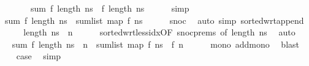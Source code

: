 \begin{isabellebody}
\ \ \ \ \ \ {\isacharequal}{\kern0pt}\ sum\ f\ {\isacharbraceleft}{\kern0pt}{}{\isachardot}{\kern0pt}{\isachardot}{\kern0pt}{\isacharless}{\kern0pt}length\ ns{\isacharbraceright}{\kern0pt}\ {\isacharplus}{\kern0pt}\ f\ {\isacharparenleft}{\kern0pt}length\ ns{\isacharparenright}{\kern0pt}{\isachardoublequoteclose}\isanewline
\ \ \ \ \isamarkupfalse%
\ simp\isanewline
\ \ \isamarkupfalse%
\ \isamarkupfalse%
\ {\isachardoublequoteopen}sum\ f\ {\isacharbraceleft}{\kern0pt}{}{\isachardot}{\kern0pt}{\isachardot}{\kern0pt}{\isacharless}{\kern0pt}length\ ns{\isacharbraceright}{\kern0pt}\ {\isasymle}\ sum{\isacharunderscore}{\kern0pt}list\ {\isacharparenleft}{\kern0pt}map\ f\ ns{\isacharparenright}{\kern0pt}{\isachardoublequoteclose}\isanewline
\ \ \ \ \isamarkupfalse%
\ snoc\ \isamarkupfalse%
\ {\isacharparenleft}{\kern0pt}auto\ simp{\isacharcolon}{\kern0pt}\ sorted{\isacharunderscore}{\kern0pt}wrt{\isacharunderscore}{\kern0pt}append{\isacharparenright}{\kern0pt}\isanewline
\ \ \isamarkupfalse%
\ \isamarkupfalse%
\ {\isachardoublequoteopen}length\ ns\ {\isasymle}\ n{\isachardoublequoteclose}\isanewline
\ \ \ \ \isamarkupfalse%
\ sorted{\isacharunderscore}{\kern0pt}wrt{\isacharunderscore}{\kern0pt}less{\isacharunderscore}{\kern0pt}idx{\isacharbrackleft}{\kern0pt}OF\ snoc{\isachardot}{\kern0pt}prems{\isacharparenleft}{\kern0pt}{}{\isacharparenright}{\kern0pt}{\isacharcomma}{\kern0pt}\ of\ {\isachardoublequoteopen}length\ ns{\isachardoublequoteclose}{\isacharbrackright}{\kern0pt}\ \isamarkupfalse%
\ auto\isanewline
\ \ \isamarkupfalse%
\ \isamarkupfalse%
\ {\isachardoublequoteopen}sum\ f\ {\isacharbraceleft}{\kern0pt}{}{\isachardot}{\kern0pt}{\isachardot}{\kern0pt}{\isacharless}{\kern0pt}length\ {\isacharparenleft}{\kern0pt}ns\ {\isacharat}{\kern0pt}\ {\isacharbrackleft}{\kern0pt}n{\isacharbrackright}{\kern0pt}{\isacharparenright}{\kern0pt}{\isacharbraceright}{\kern0pt}\ {\isasymle}\ sum{\isacharunderscore}{\kern0pt}list\ {\isacharparenleft}{\kern0pt}map\ f\ ns{\isacharparenright}{\kern0pt}\ {\isacharplus}{\kern0pt}\ f\ n{\isachardoublequoteclose}\isanewline
\ \ \ \ \isamarkupfalse%
\ mono\ add{\isacharunderscore}{\kern0pt}mono\ \isamarkupfalse%
\ blast\isanewline
\ \ \isamarkupfalse%
\ {\isacharquery}{\kern0pt}case\ \isamarkupfalse%
\ simp\isanewline
{}\isamarkupfalse%

\end{isabellebody}
